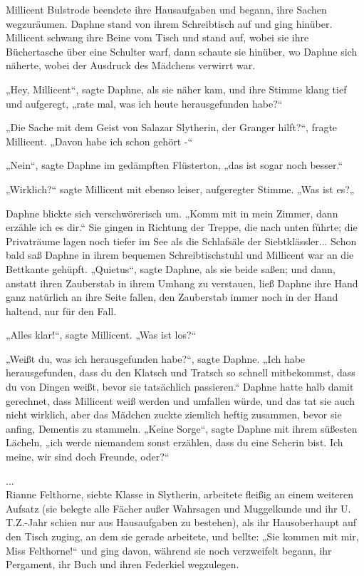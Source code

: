 {Millicent Bulstrode beendete ihre Hausaufgaben und begann, ihre Sachen wegzuräumen. Daphne stand von ihrem Schreibtisch auf und ging hinüber. Millicent schwang ihre Beine vom Tisch und stand auf, wobei sie ihre Büchertasche über eine Schulter warf, dann schaute sie hinüber, wo Daphne sich näherte, wobei der Ausdruck des Mädchens verwirrt war.

„Hey, Millicent“, sagte Daphne, als sie näher kam, und ihre Stimme klang tief und aufgeregt, „rate mal, was ich heute herausgefunden habe?“

„Die Sache mit dem Geist von Salazar Slytherin, der Granger hilft?“, fragte Millicent. „Davon habe ich schon gehört -“

„Nein“, sagte Daphne im gedämpften Flüsterton, „das ist sogar noch besser.“

„Wirklich?“ sagte Millicent mit ebenso leiser, aufgeregter Stimme. „Was ist es?„

Daphne blickte sich verschwörerisch um. „Komm mit in mein Zimmer, dann erzähle ich es dir.“ Sie gingen in Richtung der Treppe, die nach unten führte; die Privaträume lagen noch tiefer im See als die Schlafsäle der Siebtklässler... Schon bald saß Daphne in ihrem bequemen Schreibtischstuhl und Millicent war an die Bettkante gehüpft. „Quietus“, sagte Daphne, als sie beide saßen; und dann, anstatt ihren Zauberstab in ihrem Umhang zu verstauen, ließ Daphne ihre Hand ganz natürlich an ihre Seite fallen, den Zauberstab immer noch in der Hand haltend, nur für den Fall.

„Alles klar!“, sagte Millicent. „Was ist los?“

„Weißt du, was ich herausgefunden habe?“, sagte Daphne. „Ich habe herausgefunden, dass du den Klatsch und Tratsch so schnell mitbekommst, dass du von Dingen weißt, bevor sie tatsächlich passieren.“ Daphne hatte halb damit gerechnet, dass Millicent weiß werden und umfallen würde, und das tat sie auch nicht wirklich, aber das Mädchen zuckte ziemlich heftig zusammen, bevor sie anfing, Dementis zu stammeln. „Keine Sorge“, sagte Daphne mit ihrem süßesten Lächeln, „ich werde niemandem sonst erzählen, dass du eine Seherin bist. Ich meine, wir sind doch Freunde, oder?“

...\\ Rianne Felthorne, siebte Klasse in Slytherin, arbeitete fleißig an einem weiteren Aufsatz (sie belegte alle Fächer außer Wahrsagen und Muggelkunde und ihr U. T.Z.-Jahr schien nur aus Hausaufgaben zu bestehen), als ihr Hausoberhaupt auf den Tisch zuging, an dem sie gerade arbeitete, und bellte: „Sie kommen mit mir, Miss Felthorne!“ und ging davon, während sie noch verzweifelt begann, ihr Pergament, ihr Buch und ihren Federkiel wegzulegen.

}
